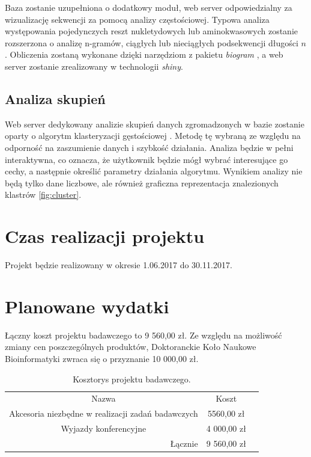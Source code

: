 \documentclass{article}
\begin{document}
Baza zostanie uzupełniona o dodatkowy moduł, web server odpowiedzialny za 
wizualizację sekwencji za pomocą analizy częstościowej. Typowa analiza 
występowania pojedynczych reszt nukletydowych lub aminokwasowych zostanie 
rozszerzona o analizę n-gramów, ciągłych lub nieciągłych podsekwencji długości 
$n$. Obliczenia zostaną wykonane dzięki narzędziom z pakietu \textit{biogram} 
\citep{burdukiewicz_biogram:_2017}, a web server zostanie zrealizowany w 
technologii \textit{shiny}.

\subsection{Analiza skupień}

Web server dedykowany analizie skupień danych zgromadzonych w bazie zostanie 
oparty o algorytm klasteryzacji gęstościowej \citep{ester_density-based_1996}. 
Metodę 
tę wybraną ze względu na odporność na zaszumienie danych i szybkość działania. 
Analiza będzie w pełni interaktywna, co oznacza, że użytkownik będzie mógł 
wybrać interesujące go cechy, a następnie określić parametry działania 
algorytmu. Wynikiem analizy nie będą tylko dane liczbowe, ale również graficzna 
reprezentacja znalezionych klastrów \ref{fig:cluster}.



\section{Czas realizacji projektu}

Projekt będzie realizowany w okresie 1.06.2017 do 30.11.2017.

\section{Planowane wydatki}

Łączny koszt projektu badawczego to 9 560,00 zł. Ze względu na możliwość zmiany 
cen poszczególnych produktów, Doktoranckie Koło Naukowe Bioinformatyki zwraca 
się o przyznanie 10 000,00 zł.

\begin{table}[!htbp]
\centering
\caption{Kosztorys projektu badawczego.}
\begin{tabular}{rrr}
\cline{1-2}
\multicolumn{1}{|c}{Nazwa}                                   & \multicolumn{1}{|c|}{Koszt}   &  \\ \cline{1-2}
\multicolumn{1}{|c}{Akcesoria niezbędne w realizacji zadań badawczych}   & 
\multicolumn{1}{|c|}{5560,00 zł} &  \\ \cline{1-2}
\multicolumn{1}{|c}{Wyjazdy konferencyjne}   & 
\multicolumn{1}{|c|}{4 000,00 zł} &  \\ \cline{1-2}
Łącznie    & 9 560,00 zł                    & 
\end{tabular}
\end{table}
\end{document}
